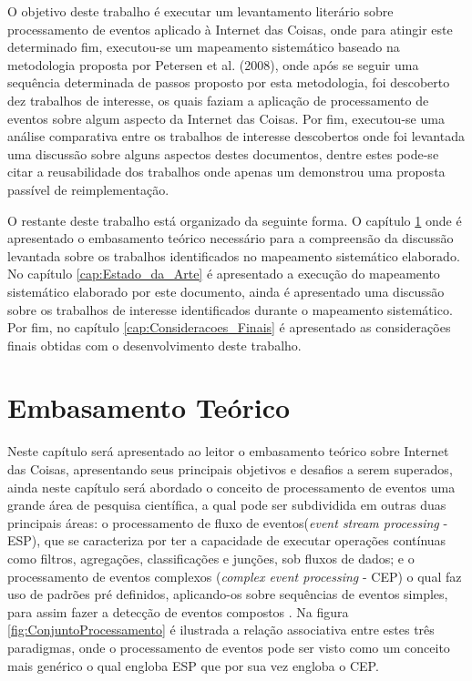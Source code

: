\documentclass[ti,table]{texufpel} %
\begin{document}
  

O objetivo deste trabalho é executar um levantamento literário sobre processamento de eventos aplicado à Internet das Coisas, onde para atingir este determinado fim, executou-se um mapeamento sistemático baseado na metodologia proposta por Petersen et al. (2008), onde após se seguir uma sequência determinada de passos proposto por esta metodologia, foi descoberto dez trabalhos de interesse, os quais faziam a aplicação de processamento de eventos sobre algum aspecto da Internet das Coisas. Por fim, executou-se uma análise comparativa entre os trabalhos de interesse descobertos onde foi levantada uma discussão sobre alguns aspectos destes documentos, dentre estes pode-se citar a reusabilidade dos trabalhos onde apenas um demonstrou uma proposta passível de reimplementação.  

  

  

O restante deste trabalho está organizado da seguinte forma. O capítulo \ref{cap:Embasamento_Teorico} onde é apresentado o embasamento teórico necessário para a compreensão da discussão levantada sobre os trabalhos identificados no mapeamento sistemático elaborado. No capítulo \ref{cap:Estado_da_Arte} é apresentado a execução do mapeamento sistemático elaborado por este documento, ainda é apresentado uma discussão sobre os trabalhos de interesse identificados durante o mapeamento sistemático. Por fim, no capítulo \ref{cap:Consideracoes_Finais} é apresentado as considerações finais obtidas com o desenvolvimento deste trabalho. 

  

  

  

  

\chapter{Embasamento Teórico} 

\label{cap:Embasamento_Teorico} 

  

Neste capítulo será apresentado ao leitor o embasamento teórico sobre Internet das Coisas, apresentando seus principais objetivos e desafios a serem superados, ainda neste capítulo será abordado o conceito de processamento de eventos uma grande área de pesquisa científica, a qual pode ser subdividida em outras duas principais áreas: o processamento de fluxo de eventos(\textit{event stream processing} - ESP), que se caracteriza por ter a capacidade de executar operações contínuas como filtros, agregações, classificações e junções, sob fluxos de dados; e o processamento de eventos complexos (\textit{complex event processing} - CEP) o qual faz uso de padrões pré definidos, aplicando-os sobre sequências de eventos simples, para assim fazer a detecção de eventos compostos \cite{dayarathna2018recent}. Na figura \ref{fig:ConjuntoProcessamento} é ilustrada a relação associativa entre estes três paradigmas, onde o processamento de eventos pode ser visto como um conceito mais genérico o qual engloba ESP que por sua vez engloba o CEP. 
\end{document}
